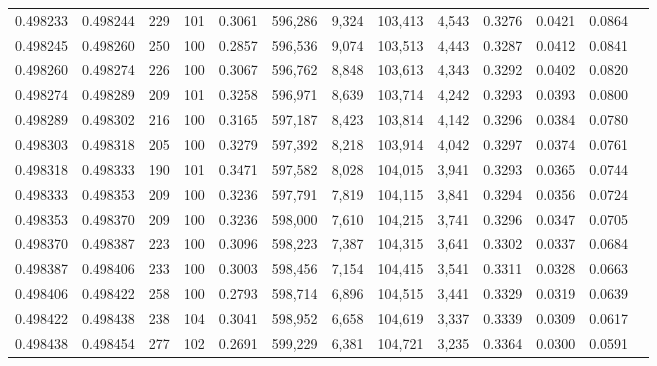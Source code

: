 \begin{tabular}{rrrrrrrrrrrrr}
0.498233 & 0.498244 &   229 & 101 &                                     0.3061 & 596,286 &   9,324 & 103,413 &   4,543 & 0.3276 & 0.0421 & 0.0864 \\
0.498245 & 0.498260 &   250 & 100 &                                     0.2857 & 596,536 &   9,074 & 103,513 &   4,443 & 0.3287 & 0.0412 & 0.0841 \\
0.498260 & 0.498274 &   226 & 100 &                                     0.3067 & 596,762 &   8,848 & 103,613 &   4,343 & 0.3292 & 0.0402 & 0.0820 \\
0.498274 & 0.498289 &   209 & 101 &                                     0.3258 & 596,971 &   8,639 & 103,714 &   4,242 & 0.3293 & 0.0393 & 0.0800 \\
0.498289 & 0.498302 &   216 & 100 &                                     0.3165 & 597,187 &   8,423 & 103,814 &   4,142 & 0.3296 & 0.0384 & 0.0780 \\
0.498303 & 0.498318 &   205 & 100 &                                     0.3279 & 597,392 &   8,218 & 103,914 &   4,042 & 0.3297 & 0.0374 & 0.0761 \\
0.498318 & 0.498333 &   190 & 101 &                                     0.3471 & 597,582 &   8,028 & 104,015 &   3,941 & 0.3293 & 0.0365 & 0.0744 \\
0.498333 & 0.498353 &   209 & 100 &                                     0.3236 & 597,791 &   7,819 & 104,115 &   3,841 & 0.3294 & 0.0356 & 0.0724 \\
0.498353 & 0.498370 &   209 & 100 &                                     0.3236 & 598,000 &   7,610 & 104,215 &   3,741 & 0.3296 & 0.0347 & 0.0705 \\
0.498370 & 0.498387 &   223 & 100 &                                     0.3096 & 598,223 &   7,387 & 104,315 &   3,641 & 0.3302 & 0.0337 & 0.0684 \\
0.498387 & 0.498406 &   233 & 100 &                                     0.3003 & 598,456 &   7,154 & 104,415 &   3,541 & 0.3311 & 0.0328 & 0.0663 \\
0.498406 & 0.498422 &   258 & 100 &                                     0.2793 & 598,714 &   6,896 & 104,515 &   3,441 & 0.3329 & 0.0319 & 0.0639 \\
0.498422 & 0.498438 &   238 & 104 &                                     0.3041 & 598,952 &   6,658 & 104,619 &   3,337 & 0.3339 & 0.0309 & 0.0617 \\
0.498438 & 0.498454 &   277 & 102 &                                     0.2691 & 599,229 &   6,381 & 104,721 &   3,235 & 0.3364 & 0.0300 & 0.0591 \\

\end{tabular}
